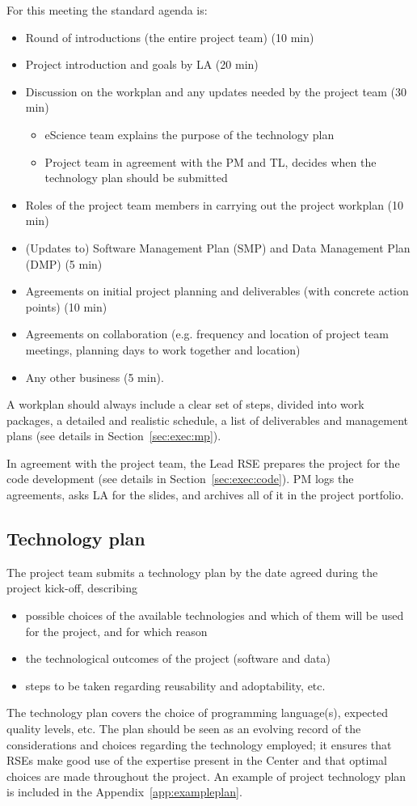 For this meeting the standard agenda is:
\begin{itemize}
\item Round of introductions (the entire project team) (10 min)
\item Project introduction and goals by LA (20 min)
\item Discussion on the workplan and any updates needed by the project team (30 min)
\begin{itemize}
\item eScience team explains the purpose of the technology plan
\item Project team in agreement with the PM and TL, decides when the technology plan should be submitted
\end{itemize}
\item Roles of the project team members in carrying out the project workplan (10 min)
\item (Updates to) Software Management Plan (SMP) and Data Management Plan (DMP) (5 min)
\item Agreements on initial project planning and deliverables (with concrete action points) (10 min)
\item Agreements on collaboration (e.g. frequency and location of project team meetings, planning days to work together and
location)
\item Any other business (5 min).
\end{itemize}

A workplan should always include a clear set of steps, divided into work packages, a detailed and realistic schedule, a
list of deliverables and management plans (see details in Section~\ref{sec:exec:mp}).

In agreement with the project team, the Lead RSE prepares the project for the code development (see details in Section~\ref{sec:exec:code}). PM logs the agreements, asks LA for the slides, and archives all of it in the project
portfolio.


\subsection{Technology plan}
\label{sec:init:techplan}

The project team submits a technology plan by the date agreed during the project kick-off, describing
\begin{itemize}
\item possible choices of the available technologies and which of them will be used for the project, and for which reason
\item the technological outcomes of the project (software and data) 
\item steps to be taken regarding reusability and adoptability, etc. 
\end{itemize}
The technology plan covers the choice of programming language(s), expected quality levels, etc. The plan should be seen
as an evolving record of the considerations and choices regarding the technology employed; it ensures that RSEs make
good use of the expertise present in the Center and that optimal choices are made throughout the project. An example of
project technology plan is included in the Appendix~\ref{app:exampleplan}.

